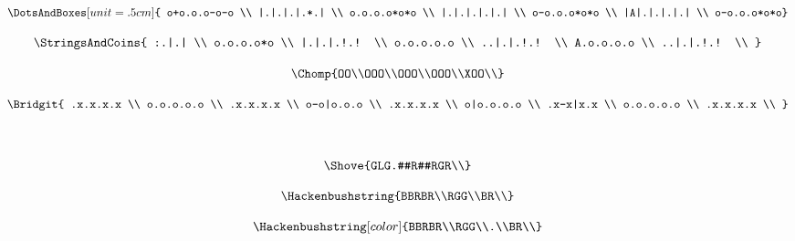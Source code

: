 \documentclass[12pt]{amsart}
\begin{document}
\[
\DotsAndBoxes[unit=.5cm]{
  o+o.o.o-o-o \\
  |.|.|.|.*.| \\
  o.o.o.o*o*o \\
  |.|.|.|.|.| \\
  o-o.o.o*o*o \\
  |A|.|.|.|.| \\
  o-o.o.o*o*o}
\]

\[
\StringsAndCoins{
:.|.| \\
o.o.o.o*o \\
|.|.|.!.! \\
o.o.o.o.o \\
..|.|.!.! \\
A.o.o.o.o \\
..|.|.!.! \\
}
\]

\[
\Chomp{OO\\OOO\\OOO\\OOO\\XOO\\}
\]

\[
\Bridgit{
.x.x.x.x \\
o.o.o.o.o \\
.x.x.x.x \\
o-o|o.o.o \\
.x.x.x.x \\
o|o.o.o.o \\
.x-x|x.x \\
o.o.o.o.o \\
.x.x.x.x \\
}
\]


\begin{center}
\ \hfill
{}
\hfill
{}
\hfill\ \ %
\end{center}

\[\Shove{GLG.#R#RGR\\}\]

\[\Hackenbushstring{BBRBR\\RGG\\BR\\}\]

\[\Hackenbushstring[color]{BBRBR\\RGG\\.\\BR\\}\]
\end{document}
